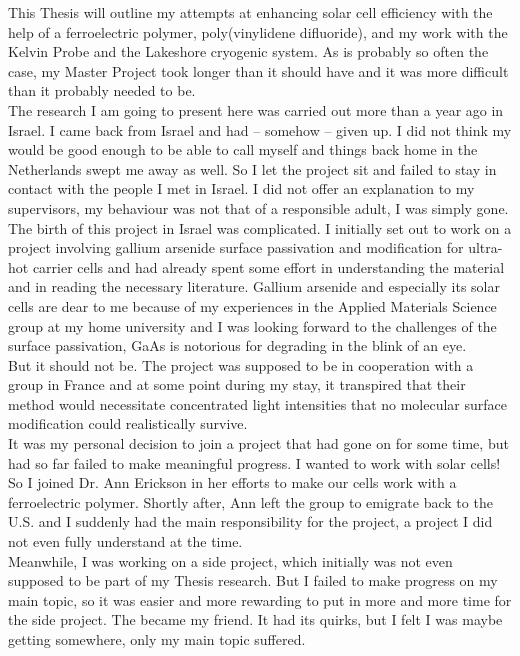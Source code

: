 \begin{personalintro}
\addchaptertocentry{\introname}
This Thesis will outline my attempts at enhancing solar cell efficiency with the help of a ferroelectric polymer, poly(vinylidene difluoride), and my work with the \McA{} Kelvin Probe and the Lakeshore cryogenic system. As is probably so often the case, my Master Project took longer than it should have and it was more difficult than it probably needed to be.\\
The research I am going to present here was carried out more than a year ago in Israel. I came back from Israel and had -- somehow -- given up. I did not think my  would be good enough to be able to call myself \degreename{} and things back home in the Netherlands swept me away as well. So I let the project sit and failed to stay in contact with the people I met in Israel. I did not offer an explanation to my supervisors, my behaviour was not that of a responsible adult, I was simply gone.\\
The birth of this project in Israel was complicated. I initially set out to work on a project involving gallium arsenide surface passivation and modification for ultra-hot carrier cells and had already spent some effort in understanding the material and in reading the necessary literature. Gallium arsenide and especially its solar cells are dear to me because of my experiences in the Applied Materials Science group at my home university and I was looking forward to the challenges of the surface passivation, GaAs is notorious for degrading in the blink of an eye.\\
But it should not be. The project was supposed to be in cooperation with a group in France and at some point during my stay, it transpired that their method would necessitate concentrated light intensities that no molecular surface modification could realistically survive.\\
It was my personal decision to join a project that had gone on for some time, but had so far failed to make meaningful progress. I wanted to work with solar cells! So I joined Dr. Ann Erickson in her efforts to make our cells work with a ferroelectric polymer. Shortly after, Ann left the group to emigrate back to the U.S. and I suddenly had the main responsibility for the project, a project I did not even fully understand at the time.\\
Meanwhile, I was working on a side project, which initially was not even supposed to be part of my Thesis research. But I failed to make progress on my main topic, so it was easier and more rewarding to put in more and more time for the side project. The \McA{} became my friend. It had its quirks, but I felt I was maybe getting somewhere, only my main topic suffered.\\

\end{personalintro}

